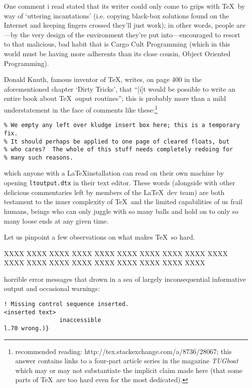 One comment i read stated that its writer could only come to grips with \TeX\ by way of `uttering
incantations' (i.e. copying black-box solutions found on the Internet and keeping fingers crossed they'll
just work); in other words, people are---by the very design of the environment they're put into---encouraged
to resort to that malicious, bad habit that is Cargo Cult Programming (which
in this world must be having more adherents than its close cousin, Object Oriented Programming).

Donald Knuth, famous inventor of \TeX, writes, on page 400 in the aforementioned chapter `Dirty Tricks',
that ``[i]t would be possible to write an entire book about \TeX\ ouput routines''; this is probably more
than a mild understatement in the face of comments like these:\footnote{recommended reading:
http://tex.stackexchange.com/a/8736/28067; this answer contains links to a four-part article series in the
magazine {\em TUGboat} which may or may not substantiate the implicit claim made here (that some parts of
\TeX\ are  too hard even for the most dedicated).}

\begin{verbatim}
% We empty any left over kludge insert box here; this is a temporary fix.
% It should perhaps be applied to one page of cleared floats, but
% who cares?  The whole of this stuff needs completely redoing for
% many such reasons.
\end{verbatim}

which anyone with a \LaTeX installation can read on their own machine by opening \verb#ltoutput.dtx# in
their text editor. These words (alongside with other delicious commentaries left by members of the \LaTeX\
dev team) are both testament to the inner complexity of \TeX\ and the limited capabilities of us frail
humans, beings who can only juggle with so many balls and hold on to only so many loose ends at any given time.



Let us pinpoint a few observations on what makes \TeX\ so hard.

XXXX XXXX XXXX XXXX XXXX XXXX XXXX XXXX XXXX XXXX XXXX XXXX XXXX XXXX XXXX XXXX XXXX XXXX XXXX

horrible error messages that drown in a sea of largely inconsequential informative output and
occasional warnings:

\begin{verbatim}
! Missing control sequence inserted.
<inserted text>
                inaccessible
l.70 wrong.)}
\end{verbatim}

